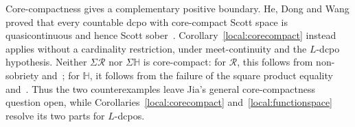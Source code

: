 \documentclass[fleqn,preprint,3p,a4paper]{elsarticle}
\theoremstyle{definition}
\newcommand{\HH}{\mathbb H}
\newcommand{\RR}{\mathcal R}
\begin{document}
Core-compactness gives a complementary positive boundary. He, Dong and Wang proved that every countable dcpo with core-compact Scott space is quasicontinuous and hence Scott sober~\cite[Theorem~3.3]{HDW}. Corollary~\ref{local:corecompact} instead applies without a cardinality restriction, under meet-continuity and the $L$-dcpo hypothesis. Neither $\Sigma\RR$ nor $\Sigma\HH$ is core-compact: for $\RR$, this follows from non-sobriety and~\cite[Theorem~3.3]{HDW}; for $\HH$, it follows from the failure of the square product equality and~\cite[Theorem~II-4.13]{GHK}. Thus the two counterexamples leave Jia's general core-compactness question open, while Corollaries~\ref{local:corecompact} and~\ref{local:functionspace} resolve its two parts for $L$-dcpos.








\end{document}
